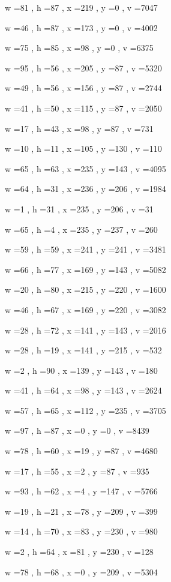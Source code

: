 \documentclass[11pt]{article}
\begin{document}
w =81 , h =87 , x =219 , y =0 , v =7047
\par
w =46 , h =87 , x =173 , y =0 , v =4002
\par
w =75 , h =85 , x =98 , y =0 , v =6375
\par
w =95 , h =56 , x =205 , y =87 , v =5320
\par
w =49 , h =56 , x =156 , y =87 , v =2744
\par
w =41 , h =50 , x =115 , y =87 , v =2050
\par
w =17 , h =43 , x =98 , y =87 , v =731
\par
w =10 , h =11 , x =105 , y =130 , v =110
\par
w =65 , h =63 , x =235 , y =143 , v =4095
\par
w =64 , h =31 , x =236 , y =206 , v =1984
\par
w =1 , h =31 , x =235 , y =206 , v =31
\par
w =65 , h =4 , x =235 , y =237 , v =260
\par
w =59 , h =59 , x =241 , y =241 , v =3481
\par
w =66 , h =77 , x =169 , y =143 , v =5082
\par
w =20 , h =80 , x =215 , y =220 , v =1600
\par
w =46 , h =67 , x =169 , y =220 , v =3082
\par
w =28 , h =72 , x =141 , y =143 , v =2016
\par
w =28 , h =19 , x =141 , y =215 , v =532
\par
w =2 , h =90 , x =139 , y =143 , v =180
\par
w =41 , h =64 , x =98 , y =143 , v =2624
\par
w =57 , h =65 , x =112 , y =235 , v =3705
\par
w =97 , h =87 , x =0 , y =0 , v =8439
\par
w =78 , h =60 , x =19 , y =87 , v =4680
\par
w =17 , h =55 , x =2 , y =87 , v =935
\par
w =93 , h =62 , x =4 , y =147 , v =5766
\par
w =19 , h =21 , x =78 , y =209 , v =399
\par
w =14 , h =70 , x =83 , y =230 , v =980
\par
w =2 , h =64 , x =81 , y =230 , v =128
\par
w =78 , h =68 , x =0 , y =209 , v =5304
\par
\newpage
\end{document}
